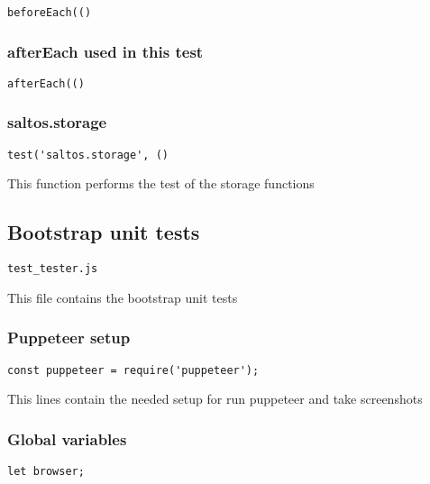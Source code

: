 \documentclass[a4paper]{article}
\begin{document}
\begin{lstlisting}
beforeEach(()
\end{lstlisting}

\hypertarget{toc258}{}
\subsubsection{afterEach used in this test}

\begin{lstlisting}
afterEach(()
\end{lstlisting}

\hypertarget{toc259}{}
\subsubsection{saltos.storage}

\begin{lstlisting}
test('saltos.storage', ()
\end{lstlisting}

This function performs the test of the storage functions

\hypertarget{toc260}{}
\subsection{Bootstrap unit tests}

\begin{lstlisting}
test_tester.js
\end{lstlisting}

This file contains the bootstrap unit tests

\hypertarget{toc261}{}
\subsubsection{Puppeteer setup}

\begin{lstlisting}
const puppeteer = require('puppeteer');
\end{lstlisting}

This lines contain the needed setup for run puppeteer and take screenshots

\hypertarget{toc262}{}
\subsubsection{Global variables}

\begin{lstlisting}
let browser;
\end{lstlisting}
\end{document}
